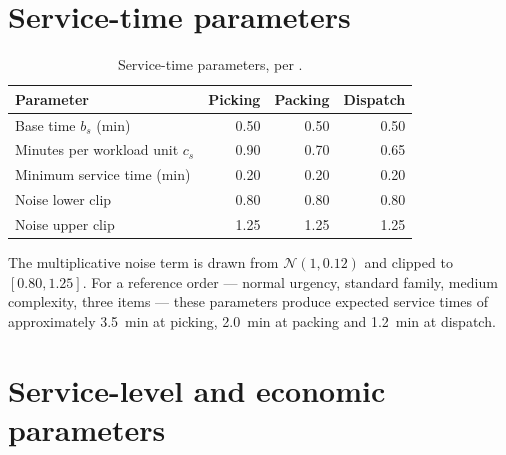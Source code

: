 \section{Service-time parameters}

\begin{table}[htbp]
\centering
\caption{Service-time parameters, per .}
\label{tab:service-params}
\small
\begin{tabular}{lrrr}
\toprule
\textbf{Parameter} & \textbf{Picking} & \textbf{Packing} & \textbf{Dispatch} \\
\midrule
Base time \(b_s\) (min)              & 0.50 & 0.50 & 0.50 \\
Minutes per workload unit \(c_s\)    & 0.90 & 0.70 & 0.65 \\
Minimum service time (min)           & 0.20 & 0.20 & 0.20 \\
Noise lower clip                     & 0.80 & 0.80 & 0.80 \\
Noise upper clip                     & 1.25 & 1.25 & 1.25 \\
\bottomrule
\end{tabular}
\end{table}

The multiplicative noise term is drawn from \(\mathcal{N}(1, 0.12)\) and clipped to
\([0.80, 1.25]\). For a reference order --- normal urgency, standard family, medium complexity,
three items --- these parameters produce expected service times of approximately
\SI{3.5}{\minute} at picking, \SI{2.0}{\minute} at packing and \SI{1.2}{\minute} at dispatch.

\section{Service-level and economic parameters}

